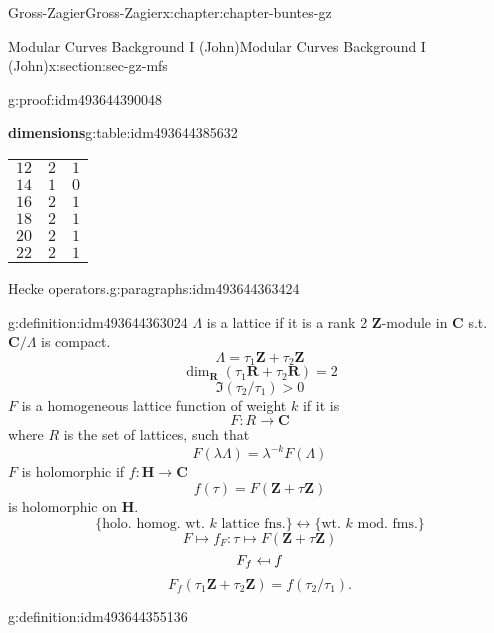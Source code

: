 \documentclass[oneside,10pt,]{book}
\numberwithin{equation}{section}
\providecommand\mapsfrom{\mathrel{\reflectbox{\ensuremath{\mapsto}}}}
\newcommand{\ZZ}{\mathbf{Z}}
\newcommand{\RR}{\mathbf{R}}
\newcommand{\CC}{\mathbf{C}}
\newcommand{\HH}{\mathbf{H}}
\newcommand{\gt}{>}
\begin{document}
\begin{chapterptx}{Gross-Zagier}{}{Gross-Zagier}{}{}{x:chapter:chapter-buntes-gz}
\begin{sectionptx}{Modular Curves Background I (John)}{}{Modular Curves Background I (John)}{}{}{x:section:sec-gz-mfs}
\begin{proofptx}{}{g:proof:idm493644390048}
\begin{tableptx}{\textbf{dimensions}}{g:table:idm493644385632}{}
\begin{tabular}{lll}
\(12\)&\(2\)&\(1\)\tabularnewline[0pt]
\(14\)&\(1\)&\(0\)\tabularnewline[0pt]
\(16\)&\(2\)&\(1\)\tabularnewline[0pt]
\(18\)&\(2\)&\(1\)\tabularnewline[0pt]
\(20\)&\(2\)&\(1\)\tabularnewline[0pt]
\(22\)&\(2\)&\(1\)
\end{tabular}
\end{tableptx}%
\end{proofptx}
\begin{paragraphs}{Hecke operators.}{g:paragraphs:idm493644363424}%
\begin{definition}{}{g:definition:idm493644363024}%
\(\Lambda \) is a lattice if it is a rank 2 \(\ZZ\)-module in \(\CC\) s.t. \(\CC/\Lambda \) is compact.%
\begin{equation*}
\Lambda = \tau _1\ZZ + \tau _2 \ZZ
\end{equation*}
%
\begin{equation*}
\dim_\RR(\tau _1 \RR + \tau _2\RR) = 2
\end{equation*}
%
\begin{equation*}
\Im (\tau _2 / \tau _1 ) \gt 0
\end{equation*}
\(F\) is a homogeneous lattice function of weight \(k\) if it is%
\begin{equation*}
F\colon R \to \CC
\end{equation*}
where \(R\) is the set of lattices, such that%
\begin{equation*}
F(\lambda \Lambda ) = \lambda ^{-k}F(\Lambda )
\end{equation*}
\(F\) is holomorphic if \(f\colon  \HH \to \CC\)%
\begin{equation*}
f(\tau ) = F(\ZZ + \tau \ZZ)
\end{equation*}
is holomorphic on \(\HH\).%
\begin{equation*}
\{\text{holo. homog. wt. }k\text{ lattice fns.}\}\leftrightarrow \{\text{wt. }k\text{ mod. fms.}\}
\end{equation*}
%
\begin{equation*}
F\mapsto f_F\colon \tau  \mapsto F(\ZZ+ \tau \ZZ)
\end{equation*}
%
\begin{equation*}
F_f \mapsfrom f
\end{equation*}
%
\begin{equation*}
F_f (\tau _1 \ZZ+ \tau _2 \ZZ) = f(\tau _2/\tau _1)\text{.}
\end{equation*}
%
\end{definition}
\begin{definition}{}{g:definition:idm493644355136}%

\end{definition}
\end{paragraphs}
\end{sectionptx}
\end{chapterptx}
\end{document}
